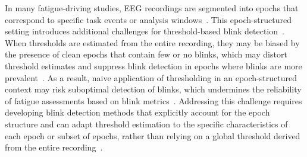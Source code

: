 In many fatigue-driving studies, EEG recordings are segmented into epochs that correspond to specific task events or analysis windows~\citep{cao2019multichannel}. This epoch-structured setting introduces additional challenges for threshold-based blink detection~\citep{tran2021detection,jefri2022eye}.
When thresholds are estimated from the entire recording, they may be biased by the presence of clean epochs that contain few or no blinks, which may distort threshold estimates and suppress blink detection in epochs where blinks are more prevalent~\citep{klein2013reliable,guttmann2019new}. As a result, naive application of thresholding in an epoch-structured context may risk suboptimal detection of blinks, which undermines the reliability of fatigue assessments based on blink metrics~\citep{ko2020eyeblink,shahbakhti2023fusion}. Addressing this challenge requires developing blink detection methods that explicitly account for the epoch structure and can adapt threshold estimation to the specific characteristics of each epoch or subset of epochs, rather than relying on a global threshold derived from the entire recording~\citep{guttmann2019new,agarwal2019blink}.
